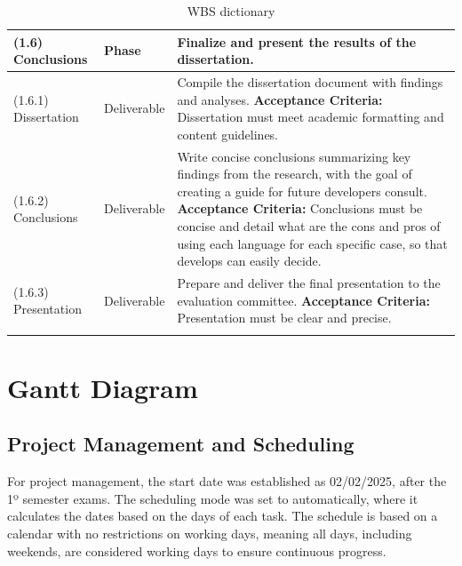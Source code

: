 \begin{longtable}{|p{3cm}|p{2.5cm}|p{8cm}|}
      (1.6) Conclusions              & Phase                 & Finalize and present the results of the dissertation.                                                                                                                                                                                                                                                                                                     \\ \hline
      (1.6.1) Dissertation           & Deliverable           & Compile the dissertation document with findings and analyses. \newline \textbf{Acceptance Criteria:} Dissertation must meet academic formatting and content guidelines.                                                                                                                                                                                   \\ \hline
      (1.6.2) Conclusions            & Deliverable           & Write concise conclusions summarizing key findings from the research, with the goal of creating a guide for future developers consult. \newline \textbf{Acceptance Criteria:} Conclusions must be concise and detail what are the cons and pros of using each language for each specific case, so that develops can easily decide.                        \\ \hline
      (1.6.3) Presentation           & Deliverable           & Prepare and deliver the final presentation to the evaluation committee. \newline \textbf{Acceptance Criteria:} Presentation must be clear and precise.                                                                                                                                                                                                    \\ \hline
      \caption{\gls{WBS} dictionary}
\end{longtable}

\section{Gantt Diagram}

\subsection{Project Management and Scheduling}

For project management, the start date was established as 02/02/2025, after the 1º semester exams. The scheduling mode was set to automatically, where it calculates the dates based on the days of each task. The schedule is based on a calendar with no restrictions on working days, meaning all days, including weekends, are considered working days to ensure continuous progress.

